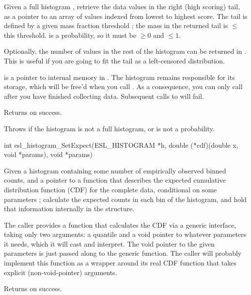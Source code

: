 \begin{sreapi}
Given a full histogram , retrieve the data values in
the right (high scoring) tail, as a pointer 
to an array of  values indexed \ccode{[0..n-1]} from
lowest to highest score. The tail is defined by a
given mass fraction threshold ; the mass in the returned
tail is $\leq$ this threshold.  is a probability,
so it must be $\geq 0$ and $\leq 1$.

Optionally, the number of values in the rest of the
histogram can be returned in . This is useful
if you are going to fit the tail as a left-censored
distribution.

 is a pointer to internal memory in . 
The histogram  remains responsible for its storage,
which will be free'd when you call .
As a consequence, you can only call 
 after you have finished
collecting data. Subsequent calls to 
will fail.

Returns  on success.

Throws  if the histogram is not a full histogram, 
or  is not a probability.


\hypertarget{func:esl_histogram_SetExpect()}
{\item[int esl\_histogram\_SetExpect(ESL\_HISTOGRAM *h, 
			double (*cdf)(double x, void *params), void *params)]}

Given a histogram  containing some number of empirically
observed binned counts, and a pointer to a function 
that describes the expected cumulative distribution function 
(CDF) for the complete data, conditional on some parameters 
; calculate the expected counts in each bin of the 
histogram, and hold that information internally in the structure.

The caller provides a function  that calculates
the CDF via a generic interface, taking only two
arguments: a quantile  and a void pointer to whatever
parameters it needs, which it will cast and interpret.
The  void pointer to the given parameters is
just passed along to the generic  function. The
caller will probably implement this  function as
a wrapper around its real CDF function that takes
explicit (non-void-pointer) arguments.

Returns  on success.


\end{sreapi}
